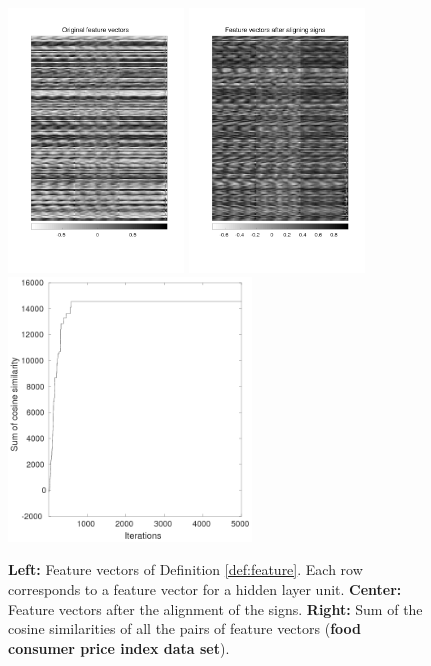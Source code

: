 \documentclass{article}
\begin{document}
\begin{figure}[t]
\centering
\includegraphics[height=70mm]{food_v_corr1.png}\hspace{2mm}
\includegraphics[height=70mm]{food_v_corr2.png}\hspace{2mm}
\includegraphics[height=70mm]{food_v_corr3.png}
\caption{\textbf{Left:} Feature vectors of Definition \ref{def:feature}. Each row corresponds to a feature vector for a hidden layer unit. \textbf{Center: } Feature vectors after the alignment of the signs. \textbf{Right: } Sum of the cosine similarities of all the pairs of feature vectors (\textbf{food consumer price index data set}). }\vspace{5mm}

\end{figure}
\end{document}
